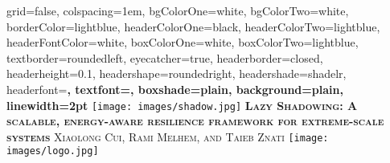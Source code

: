 \documentclass[landscape,final,a0paper,fontscale=0.285]{baposter}
\begin{document}
\begin{poster}%
  {
  grid=false,
  colspacing=1em,
  bgColorOne=white,
  bgColorTwo=white,
  borderColor=lightblue,
  headerColorOne=black,
  headerColorTwo=lightblue,
  headerFontColor=white,
  boxColorOne=white,
  boxColorTwo=lightblue,
  textborder=roundedleft,
  eyecatcher=true,
  headerborder=closed,
  headerheight=0.1\textheight,
  headershape=roundedright,
  headershade=shadelr,
  headerfont=\Large\bf\textsc, %
  textfont={\setlength{\parindent}{1.5em}},
  boxshade=plain,
  background=plain,
  linewidth=2pt
  }
  {\texttt{[image: images/shadow.jpg]}} 
  {\bf\textsc{Lazy Shadowing: A scalable, energy-aware resilience
  framework for extreme-scale systems}\vspace{0.5em}}
  {\textsc{Xiaolong Cui, Rami Melhem, and Taieb Znati}}
  {%
    \texttt{[image: images/logo.jpg]}
  }

    \newcommand{\colouredcircle}{%
      \tikz{\useasboundingbox (-0.2em,-0.32em) rectangle(0.2em,0.32em); \draw[draw=black,fill=lightblue,line width=0.03em] (0,0) circle(0.18em);}}

\end{poster}
\end{document}
